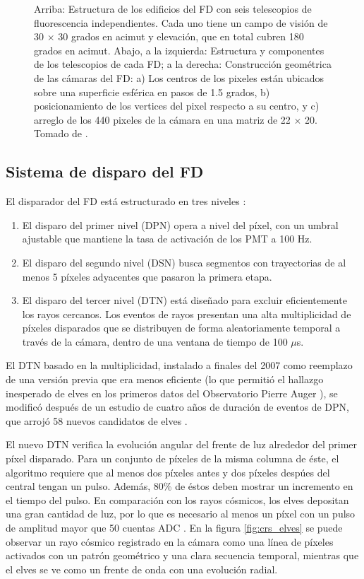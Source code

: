 \documentclass[12pt,oneside,openany,letter]{book}
\begin{document}
\begin{figure}
    \caption[]{Arriba: Estructura de los edificios del FD con seis telescopios de fluorescencia independientes. Cada uno tiene un campo de visión de 30 $\times$ 30 grados en acimut y elevación, que en total cubren 180 grados en acimut. Abajo, a la izquierda: Estructura y componentes de los telescopios de cada FD; a la derecha: Construcci\'on geom\'etrica de las c\'amaras del FD: a) Los centros de los pixeles est\'an ubicados sobre una superficie esf\'erica en pasos de 1.5 grados, b) posicionamiento de los vertices del pixel respecto a su centro, y c) arreglo de los 440 pixeles de la c\'amara en una matriz de 22 $\times$ 20. Tomado de \cite{AbrahamEtal2010}.}
    \label{fig:fd_scheme}
\end{figure}

\subsection{Sistema de disparo del FD}
El disparador del FD está estructurado en tres niveles \cite{Mussa2019}: 
\begin{enumerate}
    \item El disparo del primer nivel (DPN) opera a nivel del píxel, con un umbral ajustable que mantiene la tasa de activación de los PMT a 100 Hz.
    \item El disparo del segundo nivel (DSN) busca segmentos con trayectorias de al menos 5 píxeles adyacentes que pasaron la primera etapa. 
    \item El disparo del tercer nivel (DTN) está diseñado para excluir eficientemente los rayos cercanos. Los eventos de rayos presentan una alta multiplicidad de píxeles disparados que se distribuyen de forma aleatoriamente temporal a través de la cámara, dentro de una ventana de tiempo de 100 $\mu$s. 
\end{enumerate}

El DTN basado en la multiplicidad, instalado a finales del 2007 como reemplazo de una versi\'on previa que era menos eficiente (lo que permiti\'o el hallazgo inesperado de elves en los primeros datos del Observatorio Pierre Auger \cite{MussaCiaccio2012}), se modificó después de un estudio de cuatro años de duración de eventos de DPN, que arrojó 58 nuevos candidatos de elves \cite{Mussa2019}.

El nuevo DTN verifica la evoluci\'on angular del frente de luz alrededor del primer p\'ixel disparado. Para un conjunto de p\'ixeles de la misma columna de \'este, el algoritmo requiere que al menos dos p\'ixeles antes y dos p\'ixeles desp\'ues del central tengan un pulso. Adem\'as, 80\% de \'estos deben mostrar un incremento en el tiempo del pulso. En comparación con los rayos cósmicos, los elves depositan una gran cantidad de luz, por lo que es necesario al menos un píxel con un pulso de amplitud mayor que 50 cuentas ADC \cite{Mussa2019}. En la figura \ref{fig:crs_elves} se puede observar un rayo c\'osmico registrado en la c\'amara como una l\'inea de p\'ixeles activados con un patr\'on geom\'etrico y una clara secuencia temporal, mientras que el elves se ve como un frente de onda con una evolución radial. 
\end{document}
